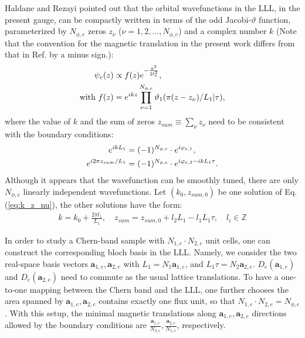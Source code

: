 Haldane and Rezayi \cite{haldane1985periodic} pointed out that the orbital wavefunctions in the LLL, in the present gauge, can be compactly written in terms of the odd Jacobi-$\vartheta$ function, parameterized by $N_{\phi,e}$ zeros $z_\nu$ ($\nu=1,2,...,N_{\phi,e}$) and a complex number $k$ (Note that the convention for the magnetic translation in the present work differs from that in Ref.\cite{haldane1985periodic} by a minus sign.):
\begin{align}
\psi_e(z)&\propto f(z)e^{-\frac{y^2}{2l_e^2}},\notag\\
\text{with } f(z)&=e^{ikz}\prod_{\nu=1}^{N_{\phi,e}}\vartheta_1(\pi(z-z_\nu)/L_1 | \tau), \label{eq:Haldane_theta}
\end{align}
where the value of $k$ and the sum of zeros $z_{sum}\equiv\sum_{\nu} z_\nu$ need to be consistent with the boundary conditions:
\begin{align}
e^{ikL_1}&=(-1)^{N_{\phi,e}}\cdot e^{i\varphi_{e,1}},\notag\\
e^{i 2\pi z_{sum}/L_1 }&=(-1)^{N_{\phi,e}}\cdot e^{i\varphi_{e,2}-ikL_1\tau}. \label{eq:k_z_nu}
\end{align}
Although it appears that the wavefunction can be smoothly tuned, there are only $N_{\phi,e}$ linearly independent wavefunctions. Let $(k_0,z_{sum,0})$ be one solution of Eq.(\ref{eq:k_z_nu}),
the other solutions have the form:
\begin{align}
k=k_0+\frac{2\pi l_1}{L_1},\quad z_{sum}=z_{sum,0}+l_2 L_1-l_1 L_1\tau, \quad l_i\in\mathbb Z \label{eq:diff_z_sum}
\end{align}

In order to study a Chern-band sample with $N_{1,e}\cdot N_{2,e}$ unit cells, one can construct the corresponding bloch basis in the LLL. Namely, we consider the two real-space basis vectors $\mathbf a_{1,e},\mathbf a_{2,e}$ with $L_1=N_1 \mathbf a_{1,e}$, and $L_1\tau=N_2 \mathbf a_{2,e}$. $D_e(\mathbf a_{1,e})$ and $D_e(\mathbf a_{2,e})$ need to commute as the usual lattice translations. To have a one-to-one mapping between the Chern band and the LLL, one further chooses the area spanned by $\mathbf a_{1,e},\mathbf a_{2,e}$ contains exactly one flux unit, so that $N_{1,e}\cdot N_{2,e}=N_{\phi,e}$. With this setup, the minimal magnetic translations along $\mathbf a_{1,e},\mathbf a_{2,e}$ directions allowed by the boundary conditions are $\frac{\mathbf a_{1,e}}{N_{2,e}},\frac{\mathbf a_{2,e}}{N_{1,e}}$, respectively. 

